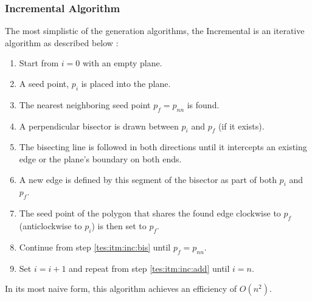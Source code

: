 \subsubsection{Incremental Algorithm}\label{tes:ssec:inc}
The most simplistic of the generation algorithms, the Incremental is an iterative algorithm as described below \citep{green1978computing} \citep{okabe2009spatial}:
\begin{enumerate}
\item Start from $i=0$ with an empty plane.
\item\label{tes:itm:inc:add} A seed point, $p_i$ is placed into the plane.
\item The nearest neighboring seed point $p_f=p_{nn}$ is found.
\item\label{tes:itm:inc:bis} A perpendicular bisector is drawn between $p_i$ and $p_f$ (if it exists).
\item The bisecting line is followed in both directions until it intercepts an existing edge or the plane's boundary on both ends.
\item A new edge is defined by this segment of the bisector as part of both $p_i$ and $p_f$.
\item The seed point of the polygon that shares the found edge clockwise to $p_f$ (anticlockwise to $p_i$) is then set to $p_f$.
\item Continue from step \ref{tes:itm:inc:bis} until $p_f=p_{nn}$.
\item Set $i = i +1$ and repeat from step \ref{tes:itm:inc:add} until $i=n$.
\end{enumerate}
In its most naive form, this algorithm achieves an efficiency of $O(n^2)$.
%
